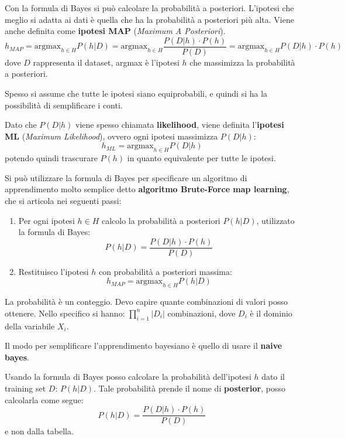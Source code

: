 Con la formula di Bayes si può calcolare la probabilità a posteriori. L'ipotesi che meglio si adatta ai dati è quella che ha la probabilità a posteriori più alta. Viene anche definita come \textbf{ipotesi MAP} (\textit{Maximum A Posteriori}).
\begin{equation}
    h_{MAP} = \text{argmax}_{h \in H} P(h|D) = \text{argmax}_{h \in H} \frac{P(D|h) \cdot P(h)}{P(D)} = \text{argmax}_{h \in H} P(D|h) \cdot P(h)
\end{equation}
dove $D$ rappresenta il dataset, argmax è l'ipotesi $h$ che massimizza la probabilità a posteriori.

Spesso si assume che tutte le ipotesi siano equiprobabili, e quindi si ha la possibilità di semplificare i conti.

Dato che $P(D | h)$ viene spesso chiamata \textbf{likelihood}, viene definita l'\textbf{ipotesi ML} (\textit{Maximum Likelihood}), ovvero ogni ipotesi massimizza $P(D|h)$:
\begin{equation}
    h_{ML} = \text{argmax}_{h \in H} P(D|h)
\end{equation}
potendo quindi trascurare $P(h)$ in quanto equivalente per tutte le ipotesi.

Si può utilizzare la formula di Bayes per specificare un algoritmo di apprendimento molto semplice detto \textbf{algoritmo Brute-Force map learning}, che si articola nei seguenti passi:
\begin{enumerate}
    \item Per ogni ipotesi $h \in H$ calcolo la probabilità a posteriori $P(h|D)$, utilizzato la formula di Bayes:
    \begin{equation}
        P(h|D) = \frac{P(D|h) \cdot P(h)}{P(D)}
    \end{equation}
    \item Restituisco l'ipotesi $h$ con probabilità a posteriori massima:
    \begin{equation}
        h_{MAP} = \text{argmax}_{h \in H} P(h|D)
    \end{equation}
\end{enumerate}
\begin{nota}
    La probabilità è un conteggio. Devo capire quante combinazioni di valori posso ottenere. Nello specifico si hanno: $\prod_{i=1}^n |D_i|$ combinazioni, dove $D_i$ è il dominio della variabile $X_i$.
\end{nota}
Il modo per semplificare l'apprendimento bayesiano è quello di usare il \textbf{naive bayes}.

Usando la formula di Bayes posso calcolare la probabilità dell'ipotesi $h$ dato il training set $D$: $P(h|D)$. Tale probabilità prende il nome di \textbf{posterior}, posso calcolarla come segue:
\begin{equation}
    P(h|D) = \frac{P(D|h) \cdot P(h)}{P(D)}
\end{equation} 
e non dalla tabella.

